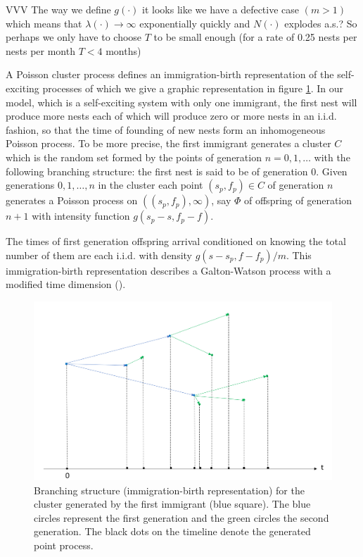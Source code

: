 \documentclass{article}
\begin{document}
{\color{red}VVV The way we define $g(\cdot)$ it looks like we have a defective case $(m > 1)$ which means that $\lambda(\cdot) \rightarrow \infty$ exponentially quickly and $N(\cdot)$ explodes a.s.? So perhaps we only have to choose $T$ to be small enough (for a rate of 0.25 nests per nests per month $T < 4$ months)}

A Poisson cluster process defines an immigration-birth representation of the self-exciting processes of which we give a graphic representation in figure \ref{fig:Hawkes}. In our model, which is a self-exciting system with only one immigrant, the first nest will produce more nests each of which will produce zero or more nests in an i.i.d. fashion, so that the time of founding of new nests form an inhomogeneous Poisson process. To be more precise, the first immigrant generates a cluster $C$ which is the random set formed by the points of generation $n = 0, 1, \dots$ with the following branching structure: the first nest is said to be of generation $0$. Given generations $0, 1, \dots, n$ in the cluster each point $(s_p, f_p) \in C$ of generation $n$ generates a Poisson process on $((s_p, f_p), \infty)$, say $\Phi$ of offspring of generation $n+1$ with intensity function $g(s_p - s, f_p - f)$.

The times of first generation offspring arrival conditioned on knowing the total number of them are each i.i.d. with density $g(s - s_p, f - f_p)/m$. This immigration-birth representation describes a Galton-Watson process with a modified time dimension (\cite{Laub}). 

\begin{figure}
\centering
    \includegraphics[width=0.8\linewidth]{Hawkes.PNG}
\caption{Branching structure (immigration-birth representation) for the cluster generated by the first immigrant (blue square). The blue circles represent the first generation and the green circles the second generation. The black dots on the timeline denote the generated point process.}
\label{fig:Hawkes}
\end{figure}
\end{document}
